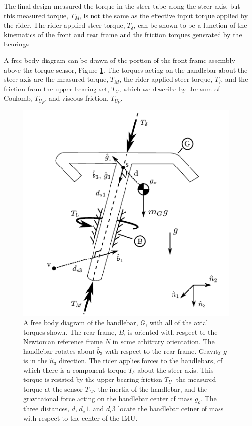 \documentclass[a4paper]{article}
\begin{document}
The final design measured the torque in the steer tube along the steer axis,
but this measured torque, $T_M$, is not the same as the effective input torque
applied by the rider. The rider applied steer torque, $T_\delta$, can be shown
to be a function of the kinematics of the front and rear frame and the friction
torques generated by the bearings.

A free body diagram can be drawn of the portion of the front frame assembly
above the torque sensor, Figure \ref{fig:handlebar-free-body}. The torques
acting on the handlebar about the steer axis are the measured torque, $T_M$,
the rider applied steer torque, $T_\delta$, and the friction from the upper
bearing set, $T_U$, which we describe by the sum of Coulomb, $T_{U_F}$, and
viscous friction, $T_{U_V}$.

\begin{figure}
  \centering
  \includegraphics{figures/handlebar-free-body.pdf}
  \caption{A free body diagram of the handlebar, $G$, with all of the axial torques
    shown. The rear frame, $B$, is oriented with respect to the Newtonian
    reference frame $N$ in some arbitrary orientation. The handlebar rotates
    about $\hat{b}_3$ with respect to the rear frame. Gravity $g$ is in the
    $\hat{n}_3$ direction. The rider applies forces to the handlebars, of which
    there is a component torque $T_\delta$ about the steer axis. This torque is
    resisted by the upper bearing friction $T_U$, the measured torque at the
    sensor $T_M$, the inertia of the handlebar, and the gravitaional force
    acting on the handlebar center of mass $g_o$. The three distances, $d$,
    $d_s1$, and $d_s3$ locate the handlebar cetner of mass with respect to the
    center of the IMU.}
  \label{fig:handlebar-free-body}
\end{figure}
\end{document}
